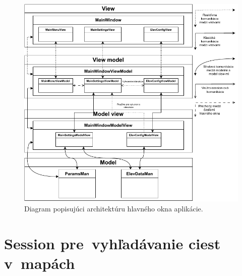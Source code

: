 \begin{figure}[h]\centering
\includegraphics[]{img/hlavne_okno}
\caption{Diagram popisujúci architektúru hlavného okna aplikácie.} 
\label{obr03:hlavne_okno}
\end{figure}

\pagebreak

\section{Session pre~vyhľadávanie ciest v~mapách}

